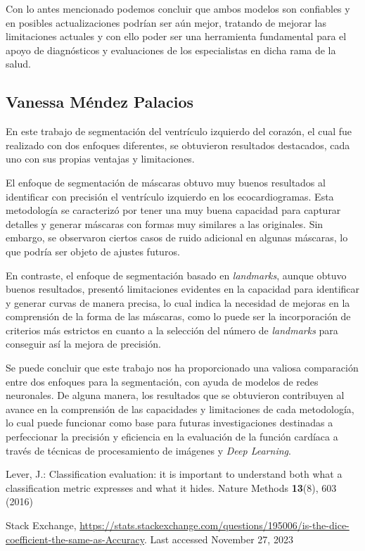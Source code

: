 \documentclass[runningheads]{llncs}
\begin{document}
Con lo antes mencionado podemos concluir que ambos modelos son confiables y en posibles actualizaciones podrían ser aún mejor, tratando de mejorar las limitaciones actuales y con ello poder ser una herramienta fundamental para el apoyo de diagnósticos y evaluaciones de los especialistas en dicha rama de la salud. 

\subsection{Vanessa Méndez Palacios}
En este trabajo de segmentación del ventrículo izquierdo del corazón, el cual fue realizado con dos enfoques diferentes, se obtuvieron resultados destacados, cada uno con sus propias ventajas y limitaciones.

El enfoque de segmentación de máscaras obtuvo muy buenos resultados al identificar con precisión el ventrículo izquierdo en los ecocardiogramas. Esta metodología se caracterizó por tener una muy buena capacidad para capturar detalles y generar máscaras con formas muy similares a las originales. Sin embargo, se observaron ciertos casos de ruido adicional en algunas máscaras, lo que podría ser objeto de ajustes futuros.

En contraste, el enfoque de segmentación basado en \textit{landmarks}, aunque obtuvo buenos resultados, presentó limitaciones evidentes en la capacidad para identificar y generar curvas de manera precisa, lo cual indica la necesidad de mejoras en la comprensión de la forma de las máscaras, como lo puede ser la incorporación de criterios más estrictos en cuanto a la selección del número de \textit{landmarks} para conseguir así la mejora de precisión.

Se puede concluir que este trabajo nos ha proporcionado una valiosa comparación entre dos enfoques para la segmentación, con ayuda de modelos de redes neuronales. De alguna manera, los resultados que se obtuvieron contribuyen al avance en la comprensión de las capacidades y limitaciones de cada metodología, lo cual puede funcionar como base para futuras investigaciones destinadas a perfeccionar la precisión y eficiencia en la evaluación de la función cardíaca a través de técnicas de procesamiento de imágenes y \textit{Deep Learning}.

%
%
%
% 
% 
%
\begin{thebibliography}{8}
Lever, J.: Classification evaluation: it is important to understand both what a classification metric expresses and what it hides. Nature Methods \textbf{13}(8), 603 (2016)

Stack Exchange, \url{https://stats.stackexchange.com/questions/195006/is-the-dice-coefficient-the-same-as-Accuracy}. Last accessed November 27, 2023
\end{thebibliography}
\end{document}
